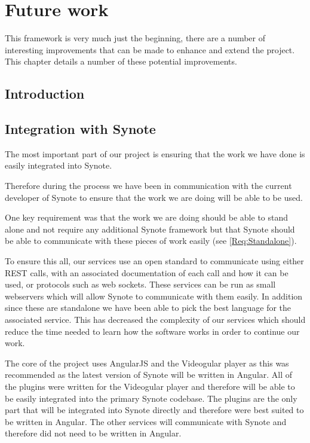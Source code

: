 \chapter{Future work} \label{Chapter: Future Work}

\begin{preamble}
This framework is very much just the beginning, there are a number of interesting improvements that can be made to enhance and extend the project. This chapter details a number of these potential improvements.
\end{preamble}

\section{Introduction}


\section{Integration with Synote}

The most important part of our project is ensuring that the work we have done is easily integrated into Synote.

Therefore during the process we have been in communication with the current developer of Synote to ensure that the work we are doing will be able to be used.

One key requirement was that the work we are doing should be able to stand alone and not require any additional Synote framework but that Synote should be able to communicate with these pieces of work easily (see \cref{Req:Standalone}).

To ensure this all, our services use an open standard to communicate using either \gls{REST} calls, with an associated documentation of each call and how it can be used, or protocols such as web sockets. These services can be run as small webservers which will allow Synote to communicate with them easily. In addition since these are standalone we have been able to pick the best language for the associated service. This has decreased the complexity of our services which should reduce the time needed to learn how the software works in order to continue our work.

The core of the project uses \gls{AngularJS} and the \gls{Videogular} player as this was recommended as the latest version of Synote will be written in Angular. All of the plugins were written for the \gls{Videogular} player and therefore will be able to be easily integrated into the primary Synote codebase. The plugins are the only part that will be integrated into Synote directly and therefore were best suited to be written in Angular. The other services will communicate with Synote and therefore did not need to be written in Angular.

